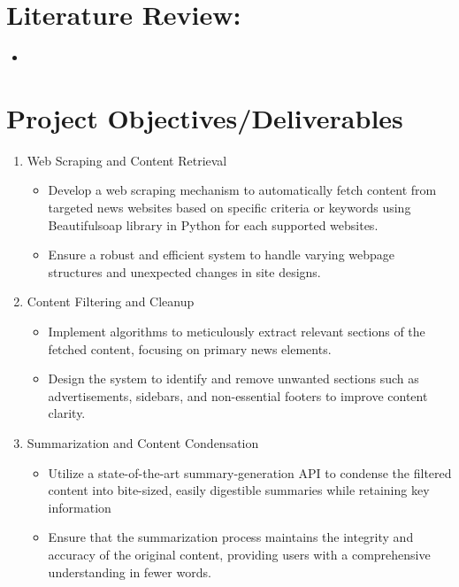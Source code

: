 \documentclass[a4paper]{article}
\begin{document}
\section{Literature Review:}

\begin{itemize}
    \item
\end{itemize}

\section{Project Objectives/Deliverables}

\begin{enumerate}
    \item Web Scraping and Content Retrieval
        \begin{itemize}
            \item Develop a web scraping mechanism to automatically fetch content from targeted news websites based on specific criteria or keywords using Beautifulsoap library in Python for each supported websites.
            \item Ensure a robust and efficient system to handle varying webpage structures and unexpected changes in site designs.
        \end{itemize} 
    \item Content Filtering and Cleanup
        \begin{itemize}
            \item Implement algorithms to meticulously extract relevant sections of the fetched content, focusing on primary news elements.
            \item Design the system to identify and remove unwanted sections such as advertisements, sidebars, and non-essential footers to improve content clarity.
        \end{itemize}
    \item Summarization and Content Condensation
        \begin{itemize}
            \item Utilize a state-of-the-art summary-generation API to condense the filtered content into bite-sized, easily digestible summaries while retaining key information
            \item Ensure that the summarization process maintains the integrity and accuracy of the original content, providing users with a comprehensive understanding in fewer words.
        \end{itemize}

\end{enumerate}
\end{document}
